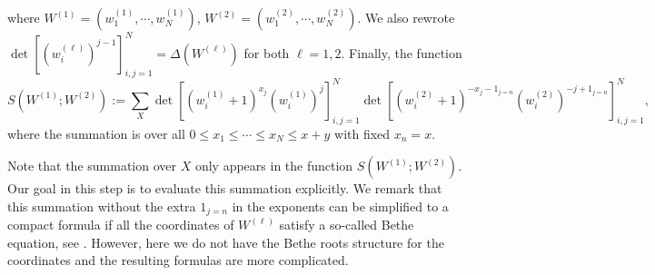 \documentclass{article}
\numberwithin{equation}{section}
\begin{document}
where $W^{(1)}=\left(w_1^{(1)},\cdots,w_N^{(1)}\right)$, $W^{(2)}=\left(w_1^{(2)},\cdots,w_N^{(2)}\right)$.  We also rewrote $\det\left[\left(w_{i}^{(\ell)}\right)^{j-1}\right]_{i,j=1}^N = \Delta\left(W^{(\ell)}\right)$ for both $\ell=1,2$. Finally, the function
\begin{equation}
	\label{eq:SW}
	S\left(W^{(1)};W^{(2)}\right)
	:=\sum_{X} 
	     \det\left[ 
               	\left( w_i^{(1)}+1\right)^{x_j}
             	\left(w_i^{(1)}\right)^j
	         \right]_{i,j=1}^N
	     \det\left[ 
	            \left( w_i^{(2)}+1\right)^{-x_j-1_{j=n}}
	            \left(w_i^{(2)}\right)^{-j+1_{j=n}}
	         \right]_{i,j=1}^N,
\end{equation}
where the summation is over all $0\le x_1\le\cdots\le x_N\le x+y$ with fixed $x_n=x$.

Note that the summation over $X$ only appears in the function $S\left(W^{(1)};W^{(2)}\right)$. Our goal in this step is to evaluate this summation explicitly. We remark that this summation without the extra $1_{j=n}$ in the exponents can be simplified to a compact formula if all the coordinates of $W^{(\ell)}$ satisfy a so-called Bethe equation, see \cite[Proposition 5.2]{Baik-Liu17}. However, here we do not have the Bethe roots structure for the coordinates and the resulting formulas are more complicated.
\end{document}
